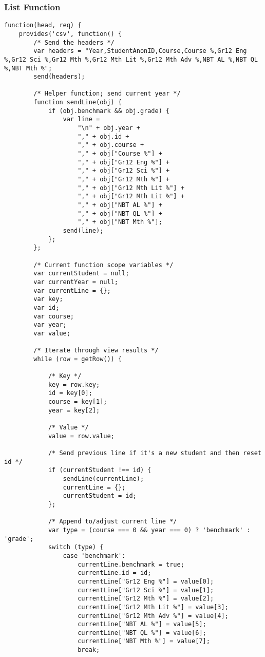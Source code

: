 \subsubsection{List Function}
\label{2-way-join-list-function}
\begin{verbatim}
function(head, req) {
    provides('csv', function() {
        /* Send the headers */
        var headers = "Year,StudentAnonID,Course,Course %,Gr12 Eng %,Gr12 Sci %,Gr12 Mth %,Gr12 Mth Lit %,Gr12 Mth Adv %,NBT AL %,NBT QL %,NBT Mth %";
        send(headers);

        /* Helper function; send current year */
        function sendLine(obj) {
            if (obj.benchmark && obj.grade) {
                var line =
                    "\n" + obj.year +
                    "," + obj.id +
                    "," + obj.course +
                    "," + obj["Course %"] +
                    "," + obj["Gr12 Eng %"] +
                    "," + obj["Gr12 Sci %"] +
                    "," + obj["Gr12 Mth %"] +
                    "," + obj["Gr12 Mth Lit %"] +
                    "," + obj["Gr12 Mth Lit %"] +
                    "," + obj["NBT AL %"] +
                    "," + obj["NBT QL %"] +
                    "," + obj["NBT Mth %"];
                send(line);
            };
        };

        /* Current function scope variables */
        var currentStudent = null;
        var currentYear = null;
        var currentLine = {};
        var key;
        var id;
        var course;
        var year;
        var value;

        /* Iterate through view results */
        while (row = getRow()) {

            /* Key */
            key = row.key;
            id = key[0];
            course = key[1];
            year = key[2];

            /* Value */
            value = row.value;

            /* Send previous line if it's a new student and then reset id */
            if (currentStudent !== id) {
                sendLine(currentLine);
                currentLine = {};
                currentStudent = id;
            };

            /* Append to/adjust current line */
            var type = (course === 0 && year === 0) ? 'benchmark' : 'grade';
            switch (type) {
                case 'benchmark':
                    currentLine.benchmark = true;
                    currentLine.id = id;
                    currentLine["Gr12 Eng %"] = value[0];
                    currentLine["Gr12 Sci %"] = value[1];
                    currentLine["Gr12 Mth %"] = value[2];
                    currentLine["Gr12 Mth Lit %"] = value[3];
                    currentLine["Gr12 Mth Adv %"] = value[4];
                    currentLine["NBT AL %"] = value[5];
                    currentLine["NBT QL %"] = value[6];
                    currentLine["NBT Mth %"] = value[7];
                    break;


\end{verbatim}
